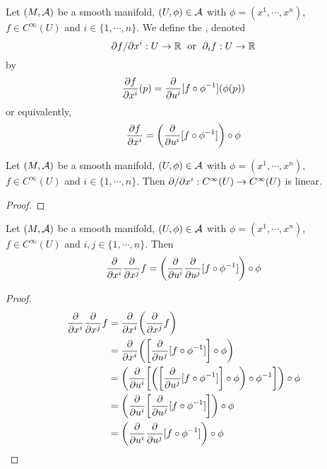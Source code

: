 \documentclass{book}
\begin{document}
	\begin{defn}
	Let $(M, \mathcal{A})$ be a smooth manifold, $(U, \phi) \in \mathcal{A}$ with $\phi = (x^1, \cdots, x^n)$, $f \in C^{\infty}(U)$ and $i \in \{1, \cdots, n\}$. We define the , denoted $$ \partial f / \partial x^i: U \rightarrow \mathbb{R} \hspace{.1cm} \text{ or } \hspace{.1cm} \partial_{i} f: U \rightarrow \mathbb{R}$$ by 
	\begin{equation*}
	\frac{\partial f}{\partial x^i}(p) = {\frac{\partial}{\partial u^i}[f \circ \phi^{-1}] }( \phi(p)) 
	\end{equation*}
	or equivalently,
	\begin{equation*}
	\frac{\partial f}{\partial x^i} = \bigg({\frac{\partial}{\partial u^i}[f \circ \phi^{-1}] \bigg) \circ \phi }
	\end{equation*}
	\end{defn}
	
	\begin{ex}
	Let $(M, \mathcal{A})$ be a smooth manifold, $(U, \phi) \in \mathcal{A}$ with $\phi = (x^1, \cdots, x^n)$, $f \in C^{\infty}(U)$ and $i \in \{1, \cdots, n\}$. Then $\partial / \partial x^i:  C^{\infty}(U) \rightarrow C^{\infty}(U)$ is linear.
	\end{ex}
	
	\begin{proof}
	\end{proof}
	
	\begin{ex}
	Let $(M, \mathcal{A})$ be a smooth manifold, $(U, \phi) \in \mathcal{A}$ with $\phi = (x^1, \cdots, x^n)$, $f \in C^{\infty}(U)$ and $i,j \in \{1, \cdots, n\}$. Then 
	$$\frac{\partial}{\partial x^i}\frac{\partial}{\partial x^j} f =  \bigg(\frac{\partial}{\partial u^i} \frac{\partial}{\partial u^j}[f \circ \phi^{-1}] \bigg) \circ \phi $$
	\end{ex}
	
	\begin{proof}
	
	\begin{align*}
	\frac{\partial}{\partial x^i}\frac{\partial}{\partial x^j} f 
	&=\frac{\partial}{\partial x^i} \bigg(\frac{\partial}{\partial x^j} f \bigg) \\
	&=\frac{\partial}{\partial x^i} \bigg( \bigg[\frac{\partial}{\partial u^j} [f \circ \phi^{-1}] \bigg] \circ \phi \bigg) \\
	&=  \bigg( \frac{\partial}{\partial u^i} \bigg[ \bigg( \bigg[\frac{\partial}{\partial u^j} [f \circ \phi^{-1}] \bigg] \circ \phi \bigg) \circ \phi^{-1} \bigg] \bigg) \circ \phi \\
	&= \bigg( \frac{\partial}{\partial u^i} \bigg[\frac{\partial}{\partial u^j} [f \circ \phi^{-1}] \bigg]  \bigg) \circ \phi \\
	&= \bigg( \frac{\partial}{\partial u^i} \frac{\partial}{\partial u^j} [f \circ \phi^{-1}]  \bigg) \circ \phi \\
	\end{align*}
	\end{proof}
	
\end{document}
